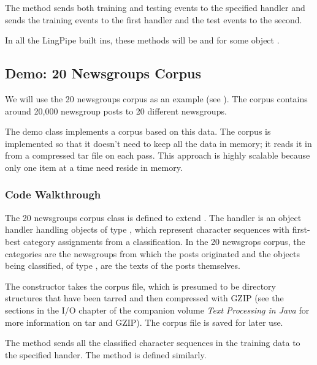 The method  sends both training and testing
events to the specified handler and  sends the
training events to the first handler and the test events to the
second.

In all the LingPipe built ins, these methods will be
 and
 for some object .

\subsection{Demo: 20 Newsgroups Corpus}\label{section:corpus-20-newsgroups-corpus}

We will use the 20 newsgroups corpus as an example (see
).  The corpus contains around 20,000
newsgroup posts to 20 different newsgroups.

The demo class  implements a corpus based
on this data.  The corpus is implemented so that it doesn't need to
keep all the data in memory; it reads it in from a compressed tar file
on each pass.  This approach is highly scalable because only one item
at a time need reside in memory.

\subsubsection{Code Walkthrough}

The 20 newsgroups corpus class is defined to extend .
%
%
The handler is an object handler handling objects of type
, which represent character sequences
with first-best category assignments from a classification.
In the 20 newsgrops corpus, the categories are the newsgroups from
which the posts originated and the objects being classified,
of type , are the texts of the posts themselves.

The constructor takes the corpus file, which is presumed to be
directory structures that have been tarred and then compressed with
GZIP (see the sections in the I/O chapter of the companion volume {\it
  Text Processing in Java} for more information on tar and GZIP).  The
corpus file is saved for later use.

The  method sends all the classified character
sequences in the training data to the specified hander.
%
%
The  method is defined similarly.  

